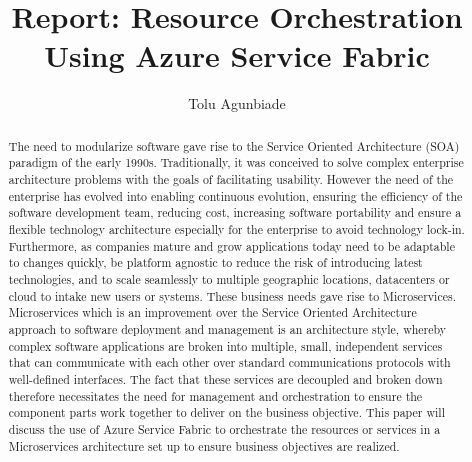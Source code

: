 
\title{Report: Resource Orchestration Using Azure Service Fabric }


\author{Tolu Agunbiade}


\renewcommand{\shortauthors}{G. v. Laszewski}


\begin{abstract}
The need to modularize software gave rise to the Service Oriented
Architecture (SOA) paradigm of the early 1990s. Traditionally, 
it was
conceived to solve complex enterprise architecture problems with the
goals of facilitating usability. However the need of the enterprise
has evolved into enabling continuous evolution, ensuring the
efficiency of the software development team, reducing cost, increasing
software portability and ensure a flexible technology architecture
especially for the enterprise to avoid technology
lock-in. Furthermore, as companies mature and grow applications today
need to be adaptable to changes quickly, be platform agnostic to
reduce the risk of introducing latest technologies, and to scale
seamlessly to multiple geographic locations, datacenters or cloud to
intake new users or systems. These business needs gave rise to
Microservices. Microservices which is an improvement over the Service
Oriented Architecture approach to software deployment and management
is an architecture style, whereby complex software applications are
broken into multiple, small, independent services that can communicate
with each other over standard communications protocols with
well-defined interfaces. The fact that these services are decoupled
and broken down therefore necessitates the need for management and
orchestration to ensure the component parts work together to deliver
on the business objective. This paper will discuss the use of Azure
Service Fabric to orchestrate the resources or services in a
Microservices architecture set up to ensure business objectives are
realized.

\end{abstract}



\maketitle


